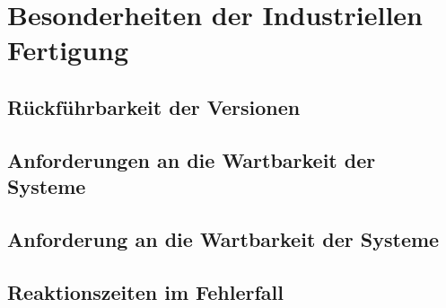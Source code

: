 \section{Besonderheiten der Industriellen Fertigung}

\subsection{Rückführbarkeit der Versionen}

\subsection{Anforderungen an die Wartbarkeit der Systeme}

\subsection{Anforderung an die Wartbarkeit der Systeme}

\subsection{Reaktionszeiten im Fehlerfall}

